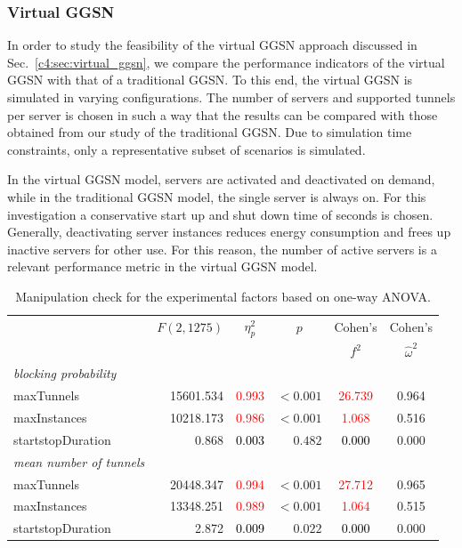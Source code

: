 \subsubsection{Virtual GGSN}
\label{c4:sec:eval_ideal_virtual_ggsn}

In order to study the feasibility of the virtual \gls{GGSN} approach discussed in Sec.~\ref{c4:sec:virtual_ggsn}, we compare the performance indicators of the virtual \gls{GGSN} with that of a traditional \gls{GGSN}. To this end, the virtual \gls{GGSN} is simulated in varying configurations.
The number of servers and supported tunnels per server is chosen in such a way that the results can be compared with those obtained from our study of the traditional \gls{GGSN}. Due to simulation time constraints, only a representative subset of scenarios is simulated.

In the virtual \gls{GGSN} model, servers are activated and deactivated on demand, while in the traditional \gls{GGSN} model, the single server is always on. For this investigation a conservative start up and shut down time of \unit[300]{seconds} is chosen. Generally, deactivating server instances reduces energy consumption and frees up inactive servers for other use. For this reason, the number of active servers is a relevant performance metric in the virtual \gls{GGSN} model.

\begin{table}
\caption{Manipulation check for the experimental factors based on one-way ANOVA.}
\centering
\label{c4:tab:manipulation2color}
\begin{tabular}{lrrrcc}
\toprule
& \multicolumn{1}{c}{$F(2,1275)$} & \multicolumn{1}{c}{$\eta^2_p$} & \multicolumn{1}{c}{$p$} & Cohen's & Cohen's\\ 
&  & & & $f^2$ & $\hat{\omega}^2$ \\ 
\midrule
\emph{blocking probability}  & & & & &\\ 
maxTunnels &  15601.534 & \textcolor{red}{0.993} & $<0.001$ & \textcolor{red}{26.739} & 0.964\\ 
maxInstances &  10218.173 & \textcolor{red}{0.986} & $<0.001$ & \textcolor{red}{1.068} & 0.516\\ 
startstopDuration &  0.868 & \textcolor{black}{0.003} & $0.482$ & \textcolor{black}{0.000} & 0.000\\ 
\midrule
\emph{mean number of tunnels}  & & & & &\\ 
maxTunnels &  20448.347 & \textcolor{red}{0.994} & $<0.001$ & \textcolor{red}{27.712} & 0.965\\ 
maxInstances &  13348.251 & \textcolor{red}{0.989} & $<0.001$ & \textcolor{red}{1.064} & 0.515\\ 
startstopDuration &  2.872 & \textcolor{black}{0.009} & $0.022$ & \textcolor{black}{0.000} & 0.000\\ 
\bottomrule
\end{tabular}
\end{table}

